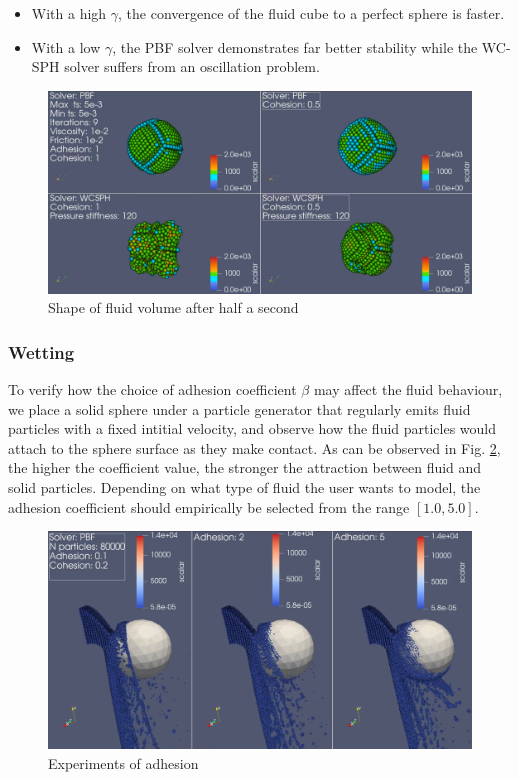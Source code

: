\documentclass[
	11pt, 
	DIV10,
	ngerman,
	a4paper, 
	oneside, 
	headings=normal, 
	captions=tableheading,
	final, 
	numbers=noenddot
]{scrartcl}
\begin{document}
\begin{itemize}
    \item With a high $ \gamma $, the convergence of the fluid cube to a perfect sphere is faster.
    \item With a low $ \gamma $, the PBF solver demonstrates far better stability while the WC-SPH solver suffers from an oscillation problem.
\end{itemize}

\begin{figure}
    \centering
    \includegraphics[width=.6\textwidth]{pics/surface_tension.png}
    \caption{Shape of fluid volume after half a second}
    \label{fig:no_gravity}
\end{figure}

\subsubsection{Wetting}

To verify how the choice of adhesion coefficient $ \beta $ may affect the fluid behaviour, we place a solid sphere under a particle generator that regularly emits fluid particles with a fixed intitial velocity, and observe how the fluid particles would attach to the sphere surface as they make contact. As can be observed in Fig. \ref{fig:wetting}, the higher the coefficient value, the stronger the attraction between fluid and solid particles. Depending on what type of fluid the user wants to model, the adhesion coefficient should empirically be selected from the range $ [1.0, 5.0] $.

\begin{figure}
    \centering
    \includegraphics[width=.6\textwidth]{pics/adhesion.png}
    \caption{Experiments of adhesion}
    \label{fig:wetting}
\end{figure}



\end{document}
